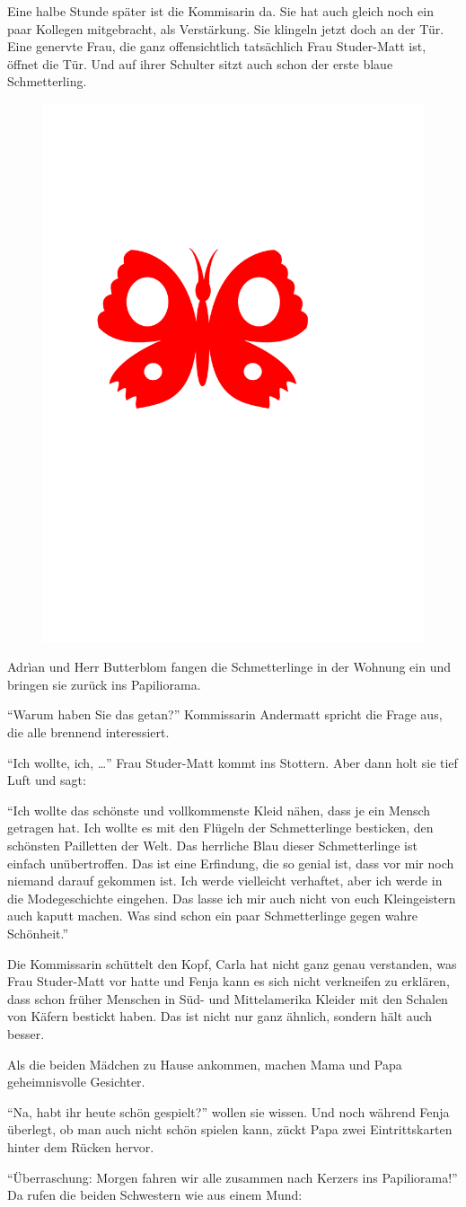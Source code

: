 Eine halbe Stunde später ist die Kommisarin da. Sie hat auch gleich noch ein paar Kollegen mitgebracht, als Verstärkung. Sie klingeln jetzt doch an der Tür. Eine genervte Frau, die ganz offensichtlich tatsächlich Frau Studer-Matt ist, öffnet die Tür. Und auf ihrer Schulter sitzt auch schon der erste blaue Schmetterling.
\begin{figure}[H]
\centering
\includegraphics[width=.05\textwidth]{bilder/inkling.pdf}
\end{figure}
Adrìan und Herr Butterblom fangen die Schmetterlinge in der Wohnung ein und bringen sie zurück ins Papiliorama. 

\enquote{Warum haben Sie das getan?} Kommissarin Andermatt spricht die Frage aus, die alle brennend interessiert.

\enquote{Ich wollte, ich, \dots} Frau Studer-Matt kommt ins Stottern. Aber dann holt sie tief Luft und sagt: 

\enquote{Ich wollte das schönste und vollkommenste Kleid nähen, dass je ein Mensch getragen hat. Ich wollte es mit den Flügeln der Schmetterlinge besticken, den schönsten Pailletten der Welt. Das herrliche Blau dieser Schmetterlinge ist einfach unübertroffen. Das ist eine Erfindung, die so genial ist, dass vor mir noch niemand darauf gekommen ist. Ich werde vielleicht verhaftet, aber ich werde in die Modegeschichte eingehen. Das lasse ich mir auch nicht von euch Kleingeistern auch kaputt machen. Was sind schon ein paar Schmetterlinge gegen wahre Schönheit.}

Die Kommissarin schüttelt den Kopf, Carla hat nicht ganz genau verstanden, was Frau Studer-Matt vor hatte und Fenja kann es sich nicht verkneifen zu erklären, dass schon früher Menschen in Süd- und Mittelamerika Kleider mit den Schalen von Käfern bestickt haben. Das ist nicht nur ganz ähnlich, sondern hält auch besser. 

Als die beiden Mädchen zu Hause ankommen, machen Mama und Papa geheimnisvolle Gesichter. 

\enquote{Na, habt ihr heute schön gespielt?} wollen sie wissen. Und noch während Fenja überlegt, ob man auch nicht schön spielen kann, zückt Papa zwei Eintrittskarten hinter dem Rücken hervor.

\enquote{Überraschung: Morgen fahren wir alle zusammen nach Kerzers ins Papiliorama!} Da rufen die beiden Schwestern wie aus einem Mund:

